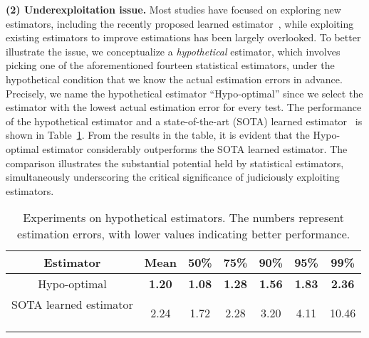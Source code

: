 \noindent\textbf{(2) Underexploitation issue.}
Most studies have focused on exploring new estimators, including the recently proposed learned estimator~\cite{li2024learning,ls_wu2022learning}, while exploiting existing estimators to improve estimations has been largely overlooked. 
To better illustrate the issue, we conceptualize a \textit{hypothetical} estimator, which involves picking one of the aforementioned fourteen statistical estimators, under the hypothetical condition that we know the actual estimation errors in advance. 
Precisely, we name the hypothetical estimator ``Hypo-optimal'' since we select the estimator with the lowest actual estimation error for every test.
The performance of the hypothetical estimator and a state-of-the-art (SOTA) learned estimator~\cite{ls_wu2022learning} is shown in Table~\ref{tab:ideal-traditional}. 
From the results in the table, it is evident that the Hypo-optimal estimator considerably outperforms the SOTA learned estimator. 
The comparison illustrates the substantial potential held by statistical estimators, simultaneously underscoring the critical significance of judiciously exploiting estimators.


\begin{table}[t]
    \centering
    \caption{Experiments on hypothetical estimators. The numbers represent estimation errors, with lower values indicating better performance.}
    \begin{tabular}{ccccccc}
\toprule
        Estimator& Mean & 50\% & 75\%& 90\% & 95\% & 99\% \\
\midrule
         Hypo-optimal  & \textbf{1.20} & \textbf{1.08} & \textbf{1.28} & \textbf{1.56} & \textbf{1.83} & \textbf{2.36} \\
        \makecell{\footnotesize SOTA learned estimator \\ \footnotesize ~\cite{ls_wu2022learning}}  & 2.24 & 1.72 & 2.28 & 3.20 & 4.11 & 10.46 \\
\bottomrule
    \end{tabular}
    \label{tab:ideal-traditional}
\end{table}

